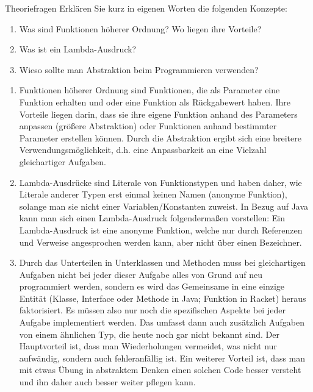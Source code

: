 \documentclass{../preamble}
\date{11.01.2021 - 15.01.2021}
\begin{document}
\maketitle

\makedisclaimer

\clearpage

\begin{task}[credit = \stars{0}{3}]{Theoriefragen}
    Erklären Sie kurz in eigenen Worten die folgenden Konzepte:
    \begin{enumerate}
        \item Was sind Funktionen höherer Ordnung? Wo liegen ihre Vorteile?
        \item Was ist ein Lambda-Ausdruck?
        \item Wieso sollte man Abstraktion beim Programmieren verwenden?
    \end{enumerate}

    \begin{solution}
        \begin{enumerate}
            \item Funktionen höherer Ordnung sind Funktionen, die als Parameter eine Funktion erhalten und oder eine Funktion als Rückgabewert haben. Ihre Vorteile liegen darin, dass sie ihre eigene Funktion anhand des Parameters anpassen (größere Abstraktion) oder Funktionen anhand bestimmter Parameter erstellen können. Durch die Abstraktion ergibt sich eine breitere Verwendungsmöglichkeit, d.h. eine Anpassbarkeit an eine Vielzahl gleichartiger Aufgaben.
            \item Lambda-Ausdrücke sind Literale von Funktionstypen und haben daher, wie Literale anderer Typen erst einmal keinen Namen (anonyme Funktion), solange man sie nicht einer Variablen/Konstanten zuweist.
	\br
	In Bezug auf Java kann man sich einen Lambda-Ausdruck folgendermaßen vorstellen: Ein Lambda-Ausdruck ist eine anonyme Funktion, welche nur durch Referenzen und Verweise angesprochen werden kann, aber nicht über einen Bezeichner. 
            \item Durch das Unterteilen in Unterklassen und Methoden muss bei gleichartigen Aufgaben nicht bei jeder dieser Aufgabe alles von Grund auf neu programmiert werden, sondern es wird das Gemeinsame in eine einzige Entität (Klasse, Interface oder Methode in Java; Funktion in Racket) heraus faktorisiert. Es müssen also nur noch die spezifischen Aspekte bei jeder Aufgabe implementiert werden. Das umfasst dann auch zusätzlich Aufgaben von einem ähnlichen Typ, die heute noch gar nicht bekannt sind. Der Hauptvorteil ist, dass man Wiederholungen vermeidet, was nicht nur aufwändig, sondern auch fehleranfällig ist. Ein weiterer Vorteil ist, dass man mit etwas Übung in abstraktem Denken einen solchen Code besser versteht und ihn daher auch besser weiter pflegen kann.
        \end{enumerate}
    \end{solution}
\end{task}
\end{document}
